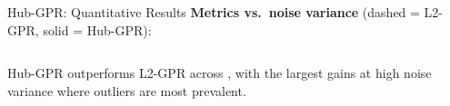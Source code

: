 \begin{frame}{Hub-GPR: Quantitative Results}
  \textbf{Metrics vs.\ noise variance}
  (dashed = L2-GPR, solid = Hub-GPR):

  \vspace{0.4em}
  \begin{columns}[T]
      \centering

      \centering

      \centering
  \end{columns}

  \vspace{0.5em}
  \begin{columns}[T]
      \begin{shibiunote}
        Hub-GPR outperforms L2-GPR across
        ,
        with the largest gains at high noise
        variance where outliers are most
        prevalent.
      \end{shibiunote}

      \centering
  \end{columns}
\end{frame}
